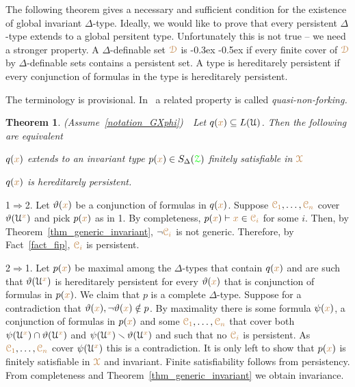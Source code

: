 \documentclass[10pt,openany]{amsproc}
\makeatletter
\newcommand{\mylabel}[1]{{\ssf{#1}}\hfill}
\renewenvironment{itemize}
  {\begin{list}{}{%
   \setlength{\parskip}{0mm}
   \setlength{\topsep}{.2\baselineskip}
   \setlength{\rightmargin}{0mm}
   \setlength{\listparindent}{0mm}
   \setlength{\itemindent}{0mm}
   \setlength{\labelwidth}{2ex}
   \setlength{\itemsep}{.1\baselineskip}
   \setlength{\parsep}{0mm}
   \setlength{\partopsep}{0mm}
   \setlength{\labelsep}{1ex}
   \setlength{\leftmargin}{\labelwidth+\labelsep}
   \let\makelabel\mylabel
   }}
   {\vspace*{-.3\baselineskip}\end{list}}
\def\proves{\vdash}
\def\IMP{\Rightarrow}
\def\D{\EuScript D}
\def\X{\EuScript X}
\def\Z{\EuScript Z}
\def\C{\EuScript C}
\def\U{\EuScript U}
\def\theta{\vartheta}
\def\ssf#1{\textsf{\small #1}}
\newcounter{thm}
\theoremstyle{mio}
\newtheorem{theorem}[thm]{Theorem}\tcolorboxenvironment{theorem}{mythm}
\providecommand{\proofNameStyle}{\bfseries}
\renewenvironment{proof}[1][\proofname]{\par
  \pushQED{\qed}%
  \normalfont%
  \trivlist
  \item[\hskip\labelsep
        \proofNameStyle
    #1\@addpunct{.}]\ignorespaces
}{%
  \popQED\endtrivlist\@endpefalse
}
\def\mr{\color{brown}}
\def\gr{\color{green}}
\def\mrD{{\mr\D}}
\def\mrX{{\mr\X}}
\def\grZ{{\gr\Z}}
\renewcommand*{\emph}[1]{%
\kern-0.3ex
\smash{\tikz[baseline]\node[rectangle, fill=black!20!yellow!50!white, rounded corners, inner xsep=0.5ex, inner ysep=0.2ex, anchor=base, minimum height = 2.7ex]{#1};}\kern-0.5ex
}
\makeatother
\begin{document}
The following theorem gives a necessary and sufficient condition for the  existence of global invariant $\Delta$-type.
Ideally, we would like to prove that every persistent $\Delta$-type extends to a global persitent type.
Unfortunately this is not true -- we need a stronger property.
A $\Delta$-definable set $\mrD$ is \emph{hereditarely persistent\/} if every finite cover of $\mrD$ by $\Delta$-definable sets contains a persistent set.
A type is hereditarely persistent if every conjunction of formulas in the type is hereditarely persistent.

The terminology is provisional.
In~\cite{CK} a related property is called \textit{quasi-non-forking.}

\begin{theorem}\label{thm_generic_invariant2}
  (Assume~\ref{notation_GXphi})\ \  
  Let $q({\mr x})\subseteq L(\U)$.
  Then the following are equivalent 
  \begin{itemize}
    \item[1.] $q({\mr x})$ extends to an invariant type $p({\mr x})\in S_\Delta(\grZ)$ finitely satisfiable in $\mrX$
    \item[2.] $q({\mr x})$ is hereditarely persistent.
  \end{itemize}
\end{theorem}

\begin{proof}
  \ssf1$\IMP$\ssf2.
  Let $\theta({\mr x})$ be a conjunction of formulas in $q({\mr x})$.
  Suppose ${\mr\C_1},\dots,{\mr\C_n}$ cover $\theta(\U^{\mr x})$ and pick $p({\mr x})$ as in \ssf1.
  By completeness, $p({\mr x})\proves {\mr x}\in{\mr\C_i}$ for some $i$.
  Then, by Theorem~\ref{thm_generic_invariant}, $\neg{\mr\C_i}$ is not generic.
  Therefore, by Fact~\ref{fact_fip}, ${\mr\C_i}$ is persistent.

  \ssf2$\IMP$\ssf1.
  Let $p({\mr x})$ be maximal among the $\Delta$-types that contain $q({\mr x})$ and are such that $\theta(\U^{\mr x})$ is hereditarely persistent for every $\theta({\mr x})$ that is conjunction of formulas in $p({\mr x})$.
  We claim that $p$ is a complete $\Delta$-type.
  Suppose for a contradiction that $\theta({\mr x}),\neg\theta({\mr x})\notin p$.
  By maximality there is some formula $\psi({\mr x})$, a conjunction of formulas in $p({\mr x})$ and some ${\mr\C_1},\dots,{\mr\C_n}$ that cover both $\psi(\U^{\mr x})\cap\theta(\U^{\mr x})$ and $\psi(\U^{\mr x})\smallsetminus\theta(\U^{\mr x})$ and such that no ${\mr\C_i}$ is persistent.
  As ${\mr\C_1},\dots,{\mr\C_n}$ cover $\psi(\U^{\mr x})$ this is a contradiction.
  It is only left to show that $p({\mr x})$ is finitely satisfiable in $\mrX$ and invariant.
  Finite satisfiability follows from persistency.
  From completeness and Theorem~\ref{thm_generic_invariant} we obtain invariance.
\end{proof}
\end{document}
